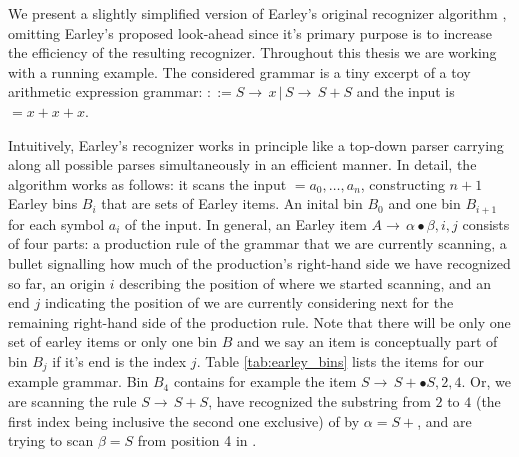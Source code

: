 %
\begin{isabellebody}%
%
%
\isadelimtheory
%
\endisadelimtheory
%
\isatagtheory
%
\endisatagtheory
{\isafoldtheory}%
%
\isadelimtheory
%
\endisadelimtheory
%
\isadelimdocument
%
\endisadelimdocument
%
\isatagdocument
%
\isamarkuptrue%
%
\endisatagdocument
{\isafolddocument}%
%
\isadelimdocument
%
\endisadelimdocument
%
\begin{isamarkuptext}%
We present a slightly simplified version of Earley's original recognizer algorithm \cite{Earley:1970},
omitting Earley's proposed look-ahead since it's primary purpose is to increase the efficiency of the
resulting recognizer. Throughout this thesis we are working with a running example. The considered grammar is a tiny excerpt of a toy
arithmetic expression grammar: \isa{{\isasymG}} $::= S \rightarrow \, x \, \vert \, S \rightarrow \, S + S$ and
the input is \isa{{\isasymomega}} $= x + x + x$.

Intuitively, Earley's recognizer works in principle like a top-down parser carrying along all possible
parses simultaneously in an efficient manner.
In detail, the algorithm works as follows: it scans the input \isa{{\isasymomega}} $=a_0,\dots,a_n$, constructing
$n+1$ Earley bins $B_i$ that are sets of Earley items. An inital bin $B_0$ and one bin $B_{i+1}$ for
each symbol $a_i$ of the input.
In general, an Earley item $A \rightarrow \, \alpha \bullet \beta, i, j$ consists of four parts: a production rule of the grammar that we are currently
scanning, a bullet signalling how much of the production's right-hand side we have recognized so far,
an origin $i$ describing the position of \isa{{\isasymomega}} where we started scanning, and an end $j$ indicating
the position  of \isa{{\isasymomega}} we are currently considering next for the remaining right-hand side of the production rule.
Note that there will be only one set of earley items or only one bin $B$ and we say an item is conceptually part of bin $B_j$ if it's end is the index $j$.
Table \ref{tab:earley_bins} lists the items for our example grammar. Bin $B_4$ contains for example the item $S \rightarrow \, S + \bullet S, 2, 4$.
Or, we are scanning the rule $S \rightarrow \, S + S$, have recognized the substring from $2$ to $4$ (the first index being
inclusive the second one exclusive) of \isa{{\isasymomega}} by $\alpha = S +$, and are trying to scan $\beta = S$ from position 4 in \omega. 


\end{isamarkuptext}
\end{isabellebody}
